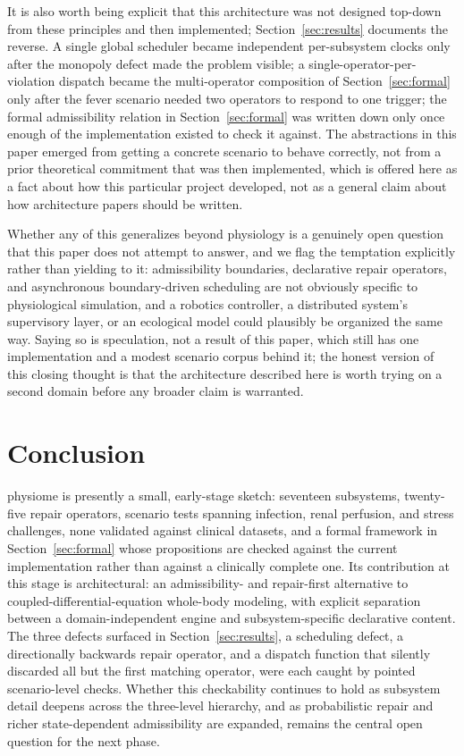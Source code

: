 \documentclass[11pt]{article}
\begin{document}
It is also worth being explicit that this architecture was not designed top-down from these principles and then implemented; Section~\ref{sec:results} documents the reverse. A single global scheduler became independent per-subsystem clocks only after the monopoly defect made the problem visible; a single-operator-per-violation dispatch became the multi-operator composition of Section~\ref{sec:formal} only after the fever scenario needed two operators to respond to one trigger; the formal admissibility relation in Section~\ref{sec:formal} was written down only once enough of the implementation existed to check it against. The abstractions in this paper emerged from getting a concrete scenario to behave correctly, not from a prior theoretical commitment that was then implemented, which is offered here as a fact about how this particular project developed, not as a general claim about how architecture papers should be written.

Whether any of this generalizes beyond physiology is a genuinely open question that this paper does not attempt to answer, and we flag the temptation explicitly rather than yielding to it: admissibility boundaries, declarative repair operators, and asynchronous boundary-driven scheduling are not obviously specific to physiological simulation, and a robotics controller, a distributed system's supervisory layer, or an ecological model could plausibly be organized the same way. Saying so is speculation, not a result of this paper, which still has one implementation and a modest scenario corpus behind it; the honest version of this closing thought is that the architecture described here is worth trying on a second domain before any broader claim is warranted.

\section{Conclusion}
\label{sec:conclusion}

physiome is presently a small, early-stage sketch: seventeen subsystems, twenty-five repair operators, scenario tests spanning infection, renal perfusion, and stress challenges, none validated against clinical datasets, and a formal framework in Section~\ref{sec:formal} whose propositions are checked against the current implementation rather than against a clinically complete one. Its contribution at this stage is architectural: an admissibility- and repair-first alternative to coupled-differential-equation whole-body modeling, with explicit separation between a domain-independent engine and subsystem-specific declarative content. The three defects surfaced in Section~\ref{sec:results}, a scheduling defect, a directionally backwards repair operator, and a dispatch function that silently discarded all but the first matching operator, were each caught by pointed scenario-level checks. Whether this checkability continues to hold as subsystem detail deepens across the three-level hierarchy, and as probabilistic repair and richer state-dependent admissibility are expanded, remains the central open question for the next phase.
\end{document}
